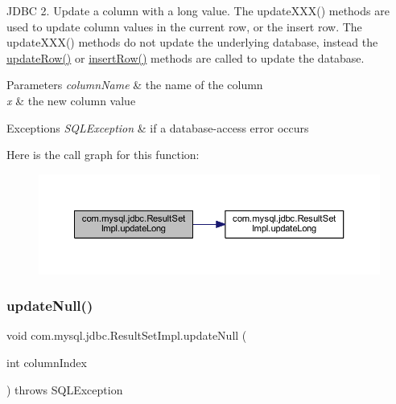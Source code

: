 J\+D\+BC 2. Update a column with a long value. The update\+X\+X\+X() methods are used to update column values in the current row, or the insert row. The update\+X\+X\+X() methods do not update the underlying database, instead the \mbox{\hyperlink{classcom_1_1mysql_1_1jdbc_1_1_result_set_impl_a2842d32292d023aaeeafedeed3322981}{update\+Row()}} or \mbox{\hyperlink{classcom_1_1mysql_1_1jdbc_1_1_result_set_impl_a78e304e3279cbcf60392f18c1385e3bf}{insert\+Row()}} methods are called to update the database.


\begin{DoxyParams}{Parameters}
{\em column\+Name} & the name of the column \\
\hline
{\em x} & the new column value\\
\hline
\end{DoxyParams}

\begin{DoxyExceptions}{Exceptions}
{\em S\+Q\+L\+Exception} & if a database-\/access error occurs \\
\hline
\end{DoxyExceptions}
Here is the call graph for this function\+:
\nopagebreak
\begin{figure}[H]
\begin{center}
\leavevmode
\includegraphics[width=350pt]{classcom_1_1mysql_1_1jdbc_1_1_result_set_impl_a29e1c50192c84c22ab2d81d3ed5b94ee_cgraph}
\end{center}
\end{figure}
\mbox{\label{classcom_1_1mysql_1_1jdbc_1_1_result_set_impl_adf55d3276cbb5778d9e53af63e7670b9}} 
\subsubsection{\texorpdfstring{update\+Null()}{updateNull()}\hspace{0.1cm}{\footnotesize\ttfamily [1/2]}}
{\footnotesize\ttfamily void com.\+mysql.\+jdbc.\+Result\+Set\+Impl.\+update\+Null (\begin{DoxyParamCaption}\item[{int}]{column\+Index }\end{DoxyParamCaption}) throws S\+Q\+L\+Exception}

